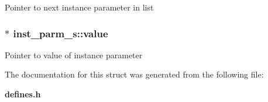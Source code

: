 Pointer to next instance parameter in list 
\subsubsection{$\ast$ {\bf inst\_\-parm\_\-s::value}}\label{structinst__parm__s_o1}


Pointer to value of instance parameter 

The documentation for this struct was generated from the following file:\begin{CompactItemize}
\item 
{\bf defines.h}\end{CompactItemize}
